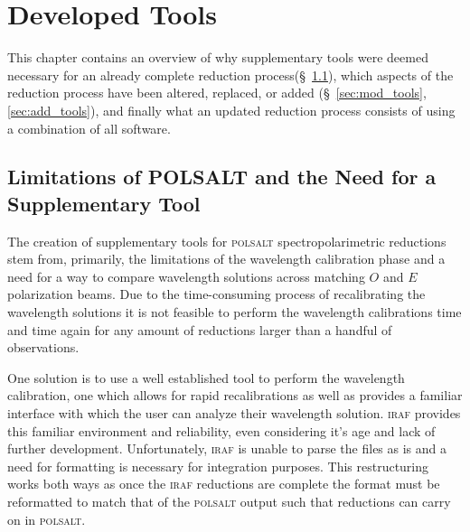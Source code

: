 \chapter{Developed Tools}

This chapter contains an overview of why supplementary tools were deemed necessary for an already complete reduction process(\S~\ref{sec:polsalt_limits}), which aspects of the reduction process have been altered, replaced, or added (\S~\ref{sec:mod_tools}, \ref{sec:add_tools}), and finally what an updated reduction process consists of using a combination of all software.


\section{Limitations of POLSALT and the Need for a Supplementary Tool} \label{sec:polsalt_limits} %

The creation of supplementary tools for \textsc{polsalt} spectropolarimetric reductions stem from, primarily, the limitations of the wavelength calibration phase and a need for a way to compare wavelength solutions across matching $O$ and $E$ polarization beams. Due to the time-consuming process of recalibrating the wavelength solutions it is not feasible to perform the wavelength calibrations time and time again for any amount of reductions larger than a handful of observations.
\prgph

One solution is to use a well established tool to perform the wavelength calibration, one which allows for rapid recalibrations as well as provides a familiar interface with which the user can analyze their wavelength solution. \textsc{iraf} provides this familiar environment and reliability, even considering it's age and lack of further development. Unfortunately, \textsc{iraf} is unable to parse the files as is and a need for formatting is necessary for integration purposes. This restructuring works both ways as once the \textsc{iraf} reductions are complete the format must be reformatted to match that of the \textsc{polsalt} output such that reductions can carry on in \textsc{polsalt}.




